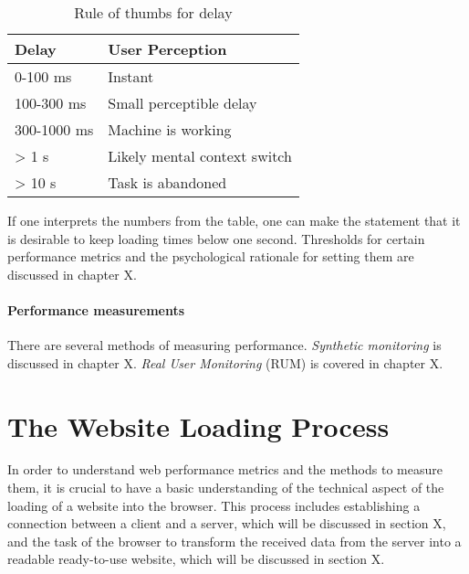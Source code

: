 \begin{table}[h]
	\small
	\centering
	\begin{tabular}{| l | l | }
	\hline
	Delay \cellcolor{lightgrey} & User Perception \cellcolor{lightgrey} \\
	\hline
	0-100 ms & Instant \\
	100-300 ms & Small perceptible delay \\
	300-1000 ms & Machine is working \\
	> 1 s & Likely mental context switch \\
	> 10 s & Task is abandoned \\
	\hline
	\end{tabular}
	\medskip
	\caption{Rule of thumbs for delay}
	\label{table:perception}
\end{table}

If one interprets the numbers from the table, one can make the statement that it is desirable to keep loading times below one second.
Thresholds for certain performance metrics and the psychological rationale for setting them are discussed in chapter X. %





\paragraph{Performance measurements}

There are several methods of measuring performance.
\textit{Synthetic monitoring }is discussed in chapter X.
\textit{Real User Monitoring} (RUM) is covered in chapter X.











\section{The Website Loading Process}



In order to understand web performance metrics and the methods to measure them, it is crucial to have a basic understanding of the technical aspect of the loading of a website into the browser.
This process includes establishing a connection between a client and a server, which will be discussed in section X, and the task of the browser to transform the received data from the server into a readable ready-to-use website, which will be discussed in section X.


